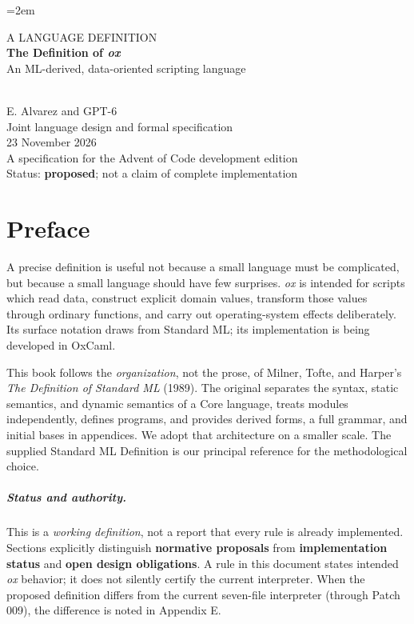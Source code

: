 \documentclass[11pt,oneside,openany]{book}
\newcommand{\ox}{\textit{ox}}
\begin{document}
\emergencystretch=2em
\frontmatter
\thispagestyle{empty}
\begin{center}
\vspace*{1.3in}
{\Large\sffamily\MakeUppercase{A language definition}}\\[.6in]
{\fontsize{43}{49}\selectfont\bfseries The Definition of \ox}\\[.18in]
{\Large An ML-derived, data-oriented scripting language}\\[.7in]
\\[.9in]
{\Large E. Alvarez \quad and \quad GPT-6}\\[.2in]
{\normalsize Joint language design and formal specification}\\
\vfill
{\large 23 November 2026}\\[7pt]
{\small A specification for the Advent of Code development edition}\\[.22in]
{\small Status: \textbf{proposed}; not a claim of complete implementation}
\end{center}
\clearpage
\chapter*{Preface}
A precise definition is useful not because a small language must be complicated, but because a small language should have few surprises. \ox{} is intended for scripts which read data, construct explicit domain values, transform those values through ordinary functions, and carry out operating-system effects deliberately. Its surface notation draws from Standard ML; its implementation is being developed in OxCaml.

This book follows the \emph{organization}, not the prose, of Milner, Tofte, and Harper's \emph{The Definition of Standard ML} (1989). The original separates the syntax, static semantics, and dynamic semantics of a Core language, treats modules independently, defines programs, and provides derived forms, a full grammar, and initial bases in appendices. We adopt that architecture on a smaller scale. The supplied Standard ML Definition is our principal reference for the methodological choice. \cite{milner1989}

\paragraph{Status and authority.} This is a \emph{working definition}, not a report that every rule is already implemented. Sections explicitly distinguish \textbf{normative proposals} from \textbf{implementation status} and \textbf{open design obligations}. A rule in this document states intended \ox{} behavior; it does not silently certify the current interpreter. When the proposed definition differs from the current seven-file interpreter (through Patch 009), the difference is noted in Appendix E.
\end{document}
